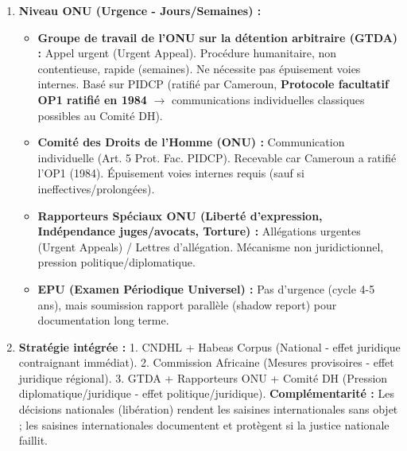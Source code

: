 \documentclass[11pt]{article}
\newcommand{\cle}[1]{{\popxbold\color{popdark}#1}}
\begin{document}
\begin{exoresolu}
\begin{enumerate}
\begin{itemize}
            \end{itemize}
        \item \textbf{Niveau ONU (Urgence - Jours/Semaines) :}
            \begin{itemize}
                \item \textbf{Groupe de travail de l'ONU sur la détention arbitraire (GTDA) :} \cle{Appel urgent (Urgent Appeal).} Procédure humanitaire, non contentieuse, rapide (semaines). Ne nécessite pas épuisement voies internes. Basé sur PIDCP (ratifié par Cameroun, \textbf{Protocole facultatif OP1 ratifié en 1984} $\rightarrow$ communications individuelles classiques possibles au Comité DH).
                \item \textbf{Comité des Droits de l'Homme (ONU) :} \cle{Communication individuelle (Art. 5 Prot. Fac. PIDCP).} Recevable car Cameroun a ratifié l'OP1 (1984). Épuisement voies internes requis (sauf si ineffectives/prolongées).
                \item \textbf{Rapporteurs Spéciaux ONU (Liberté d'expression, Indépendance juges/avocats, Torture) :} \cle{Allégations urgentes (Urgent Appeals) / Lettres d'allégation.} Mécanisme non juridictionnel, pression politique/diplomatique.
                \item \textbf{EPU (Examen Périodique Universel) :} Pas d'urgence (cycle 4-5 ans), mais soumission rapport parallèle (shadow report) pour documentation long terme.
            \end{itemize}
        \item \textbf{Stratégie intégrée :} 1. CNDHL + Habeas Corpus (National - effet juridique contraignant immédiat). 2. Commission Africaine (Mesures provisoires - effet juridique régional). 3. GTDA + Rapporteurs ONU + Comité DH (Pression diplomatique/juridique - effet politique/juridique). \textbf{Complémentarité :} Les décisions nationales (libération) rendent les saisines internationales sans objet ; les saisines internationales documentent et protègent si la justice nationale faillit.
    \end{enumerate}
\end{exoresolu}
\end{document}
